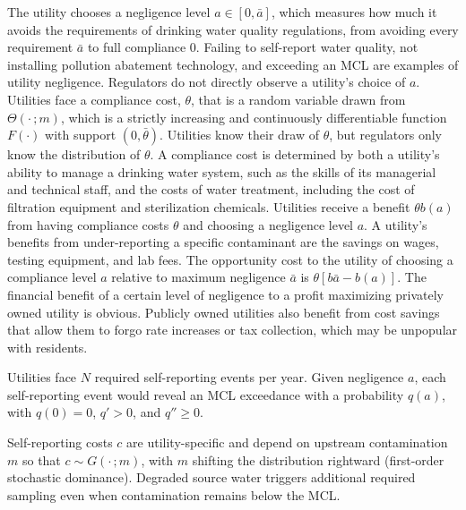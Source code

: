 The utility chooses a negligence level $a \in [0, \bar{a}]$, which measures how much it avoids the requirements of drinking water quality regulations, from avoiding every requirement $\bar{a}$ to full compliance 0. Failing to self-report water quality, not installing pollution abatement technology, and exceeding an MCL are examples of utility negligence. Regulators do not directly observe a utility's choice of $a$. Utilities face a compliance cost, $\theta$, that is a random variable drawn from $\Theta (\cdot\,;m)$, which is a strictly increasing and continuously differentiable function $F(\cdot)$ with support $(0, \bar{\theta})$. Utilities know their draw of $\theta$, but regulators only know the distribution of $\theta$. A compliance cost is determined by both a utility's ability to manage a drinking water system, such as the skills of its managerial and technical staff, and the costs of water treatment, including the cost of filtration equipment and sterilization chemicals. Utilities receive a benefit $\theta b(a)$ from having compliance costs $\theta$ and choosing a negligence level $a$. A utility's benefits from under-reporting a specific contaminant are the savings on wages, testing equipment, and lab fees. The opportunity cost to the utility of choosing a compliance level $a$ relative to maximum negligence $\bar{a}$ is $\theta[b\bar{a}-b(a)]$. The financial benefit of a certain level of negligence to a profit maximizing privately owned utility is obvious. Publicly owned utilities also benefit from cost savings that allow them to forgo rate increases or tax collection, which may be unpopular with residents.

Utilities face $N$ required self-reporting events per year. Given negligence $a$, each self-reporting event would reveal an MCL exceedance with a probability $q(a)$, with $q(0)=0$, $q'>0$, and $q'' \ge 0$.


Self-reporting costs $c$ are utility-specific and depend on upstream contamination $m$ so that $c \sim G(\cdot\,;m)$, with $m$ shifting the distribution rightward (first-order stochastic dominance). Degraded source water triggers additional required sampling even when contamination remains below the MCL.

